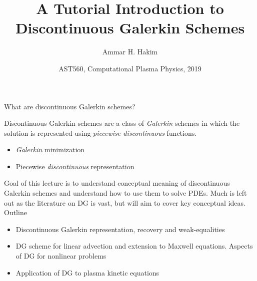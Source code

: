 \documentclass[pdf]{beamer}
\title[{\tt Intro to DG}] {A Tutorial Introduction to Discontinuous Galerkin Schemes}%
\author[http://www.ammar-hakim.org/sj]%
{Ammar H. Hakim\inst{1}}%
\institute[PPPL]
{ \inst{1} Princeton Plasma Physics Laboratory, Princeton, NJ %
}
\date[4/9/2019]{AST560, Computational Plasma Physics, 2019}
\newcommand{\mypause}{}
\theoremstyle{definition}
\begin{document}
\begin{frame}
  \titlepage
\end{frame}

\begin{frame}{What are discontinuous Galerkin schemes?}

  \begin{block}{}
    Discontinuous Galerkin schemes are a class of \emph{Galerkin}
    schemes in which the solution is represented using \emph{piecewise
      discontinuous} functions.
  \end{block}
  \mypause
  \begin{itemize}
    \item \emph{Galerkin} minimization
    \item Piecewise \emph{discontinuous} representation
  \end{itemize}
  \mypause
  Goal of this lecture is to understand conceptual meaning of
  discontinuous Galerkin schemes and understand how to use them to
  solve PDEs. Much is left out as the literature on DG is vast, but
  will aim to cover key conceptual ideas. Outline

  \begin{itemize}
  \item Discontinuous Galerkin representation, recovery and
    weak-equalities
  \item DG scheme for linear advection and extension to Maxwell
    equations. Aspects of DG for nonlinear problems
  \item Application of DG to plasma kinetic equations
  \end{itemize}  
  
\end{frame}  
\end{document}
